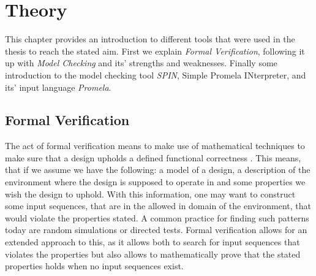 \chapter{Theory}


This chapter provides an introduction to different tools that were used in the thesis to reach the stated aim. First we explain \textit{Formal Verification}, following it up with \textit{Model Checking} and its' strengths and weaknesses. Finally some introduction to the model checking tool \textit{SPIN}, Simple Promela INterpreter, and its' input language \textit{Promela}.




\section{Formal Verification}

The act of formal verification means to make use of mathematical techniques to make sure that a design upholds a defined functional correctness \cite{bjesse2005formal}.
This means, that if we assume we have the following: a model of a design, a description of the environment where the design is supposed to operate in and some properties we wish the design to uphold. With this information, one may want to construct some input sequences, that are in the allowed in domain of the environment, that would violate the properties stated. A common practice for finding such patterns today are random simulations or directed tests.
Formal verification allows for an extended approach to this, as it allows both to search for input sequences that violates the properties but also allows to mathematically prove that the stated properties holds when no input sequences exist.

